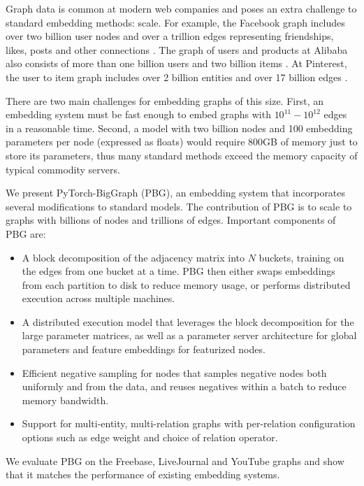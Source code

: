 \documentclass{article}
\begin{document}
Graph data is common at modern web companies and poses an extra challenge to standard embedding methods: scale. For example, the Facebook graph includes over two billion user nodes and over a trillion edges representing friendships, likes, posts and other connections \cite{ching2015one}. The graph of users and products at Alibaba also consists of more than one billion users and two billion items \cite{wang2018billion}. At Pinterest, the user to item graph includes over 2 billion entities and over 17 billion edges \cite{ying2018graph}.

There are two main challenges for embedding graphs of this size. First, an embedding system must be fast enough to embed graphs with $10^{11} - 10^{12}$ edges in a reasonable time. Second, a model with two billion nodes and 100 embedding parameters per node (expressed as floats) would require 800GB of memory just to store its parameters, thus many standard methods exceed the memory capacity of typical commodity servers.

We present PyTorch-BigGraph (PBG), an embedding system that incorporates several modifications to standard models. The contribution of PBG is to scale to graphs with billions of nodes and trillions of edges. Important components of PBG are:

\begin{itemize}
\item A block decomposition of the adjacency matrix into $N$ buckets, training on the edges from one bucket at a time. PBG then either swaps embeddings from each partition to disk to reduce memory usage, or performs distributed execution across multiple machines.
\item A distributed execution model that leverages the block decomposition for the large parameter matrices, as well as a parameter server architecture for global parameters and feature embeddings for featurized nodes.
\item Efficient negative sampling for nodes that samples negative nodes both uniformly and from the data, and reuses negatives within a batch to reduce memory bandwidth.
\item Support for multi-entity, multi-relation graphs with per-relation configuration options such as edge weight and choice of relation operator.
\end{itemize}

We evaluate PBG on the Freebase, LiveJournal and YouTube graphs and show that it matches the performance of existing embedding systems.
\end{document}
